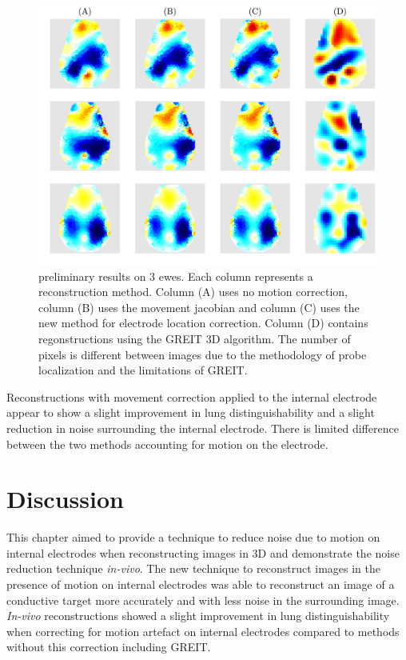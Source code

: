 \begin{figure}
    \centering
	\includegraphics[width=\textwidth]{chapter7-internal_elec_motion/imgs/lamb_reconstruction_all.pdf} 
	\caption[Results of the probe location correction]{\label{fig:internal_reconstructions} 
	preliminary results on 3 ewes. Each column represents a reconstruction method. Column (A)
	uses no motion correction, column (B) uses the movement jacobian and column (C) uses the new method
	for electrode location correction. Column (D) contains regonstructions using the GREIT 3D algorithm.
	The number of pixels is different between images due to the methodology of probe localization and 
	the limitations of GREIT.}
\end{figure}

Reconstructions with movement correction applied to the internal electrode appear to show a 
slight improvement in lung distinguishability and a slight reduction
in noise surrounding the internal electrode. There is limited difference between the
two methods accounting for motion on the electrode.

\section{Discussion}

This chapter aimed to provide a technique to reduce noise due to motion on internal
electrodes when reconstructing images in 3D and demonstrate the noise reduction technique
\emph{in-vivo}. The new technique to reconstruct images in the presence of motion 
on internal electrodes was able to reconstruct an image of a conductive target 
more accurately and with less noise in the surrounding image. \emph{In-vivo}
reconstructions showed a slight improvement in lung distinguishability when correcting
for motion artefact on internal electrodes compared to methods without this correction 
including GREIT. 

